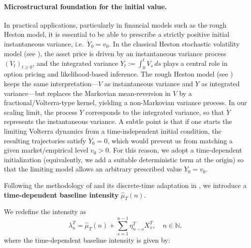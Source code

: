 \documentclass[letterpaper]{article}
\numberwithin{equation}{section}
\theoremstyle{definition}
\theoremstyle{remark}
\begin{document}
\paragraph{Microstructural foundation for the initial value.}
{
In practical applications, particularly in financial models such as the rough Heston model, it is essential to be able to prescribe a strictly positive initial instantaneous variance, i.e.\ $\dot Y_0=v_0$. 
In the classical Heston stochastic volatility model (see \cite{heston1993closed}), the asset price is driven by an instantaneous variance process $(V_t)_{t\ge0}$, and the integrated variance $Y_t:=\int_0^t V_s\,ds$ plays a central role in option pricing and likelihood-based inference. 
The rough Heston model (see \cite{el2019characteristic}) keeps the same interpretation---$V$ as instantaneous variance and $Y$ as integrated variance---but replaces the Markovian mean-reversion in $V$ by a fractional/Volterra-type kernel, yielding a non-Markovian variance process.
In our scaling limit, the process $Y$ corresponds to the integrated variance, so that $\dot Y$ represents the instantaneous variance. 
A subtle point is that if one starts the limiting Volterra dynamics from a time-independent initial condition, the resulting trajectories satisfy $\dot Y_0=0$, which would prevent us from matching a given market/empirical level $v_0>0$. 
For this reason, we adopt a time-dependent initialization (equivalently, we add a suitable deterministic term at the origin) so that the limiting model allows an arbitrary prescribed value $\dot Y_0=v_0$.
}

Following the methodology of \cite{el2019characteristic} and its discrete-time adaptation in \cite{wang2025rough}, we introduce a \textbf{time-dependent baseline intensity} $\hat{\mu}_T(n)$.

We redefine the intensity as
\begin{equation}\label{eq:lambdaT_time_dep}
  \lambda_n^T = \hat{\mu}_T(n) + \sum_{s=1}^{n-1} \eta_{n-s}^T X_s^T, \quad n \in \mathbb{N},
\end{equation}
where the time-dependent baseline intensity is given by:
\end{document}
